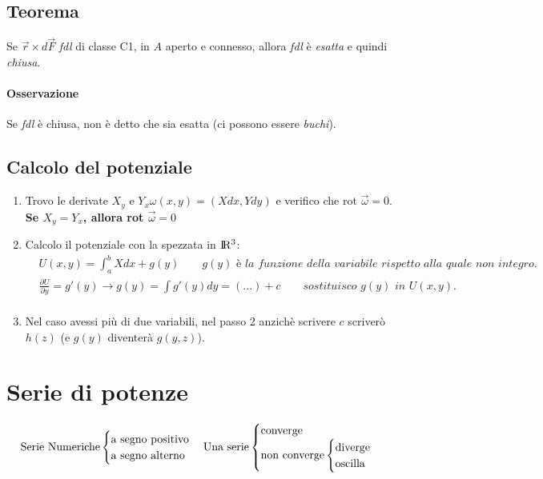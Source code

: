 \documentclass[10pt,a4paper,fleqn]{article}
\begin{document}
	\subsection{Teorema}

	Se $\vec r \times d\vec F$ \emph{fdl} di classe C1, in $A$ aperto e connesso, allora \emph{fdl} è \emph{esatta} e quindi \emph{chiusa}.
	\paragraph{Osservazione} Se \emph{fdl} è chiusa, non è detto che sia esatta (ci possono essere \emph{buchi}).

	\subsection{Calcolo del potenziale}

	\begin{enumerate}
	\item Trovo le derivate $X_y$ e $Y_x$\quad $\omega(x,y)=(Xdx, Ydy)$ e verifico che rot $\vec\omega=0$.\\\textbf{Se $X_y = Y_x$, allora rot $ \vec\omega = 0$}
	\item Calcolo il potenziale con la spezzata in $\rm I\!R^3$:
		\begin{equation}
		\begin{aligned}
		&U(x,y)=\int_a^b Xdx + g(y) \qquad \textit{$g(y)$ è la funzione della variabile rispetto alla quale non integro.}\\
		&\frac{\partial U}{\partial y} = g'(y) \longrightarrow g(y)=\int g'(y)dy = (...)+c \qquad \textit{sostituisco $g(y)$ in $U(x,y)$.}\\
		&\text{}
		\end{aligned}
		\end{equation}
		\item Nel caso avessi più di due variabili, nel passo 2 anzichè scrivere $c$ scriverò $h(z)$ (e $g(y)$ diventerà $g(y,z)$).
	\end{enumerate}
	
	\section{Serie di potenze}
	\begin{equation}
		\text{Serie Numeriche}
			\begin{cases}
				\text{a segno positivo}\\
				\text{a segno alterno}
			\end{cases}\\
		\text{Una serie}
			\begin{cases}
				\text{converge}\\
				\text{non converge}\begin{cases}
					\text{diverge}\\
					\text{oscilla}
				\end{cases}
			\end{cases}
	\end{equation}
\end{document}
